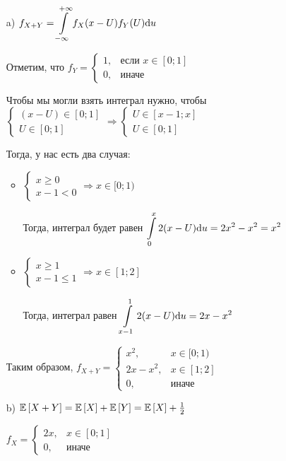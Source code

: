 \documentclass{article}
\begin{document}
\begin{enumerate}
    \item[a)] $f_{X+Y}=\displaystyle\int\limits_{-\infty}^{+\infty} f_{X}(x-U)f_{Y}(U)\text{d}u$

    Отметим, что $f_{Y}=\begin{cases}
        1,&\text{если }x\in[0;1]\\
        0,&\text{иначе}
    \end{cases}$
    
     Чтобы мы могли взять интеграл нужно, чтобы $\begin{cases}
        (x-U)\in[0;1]\\
        U\in[0;1]
    \end{cases}\Longrightarrow\begin{cases}
        U\in[x-1;x]\\
        U\in[0;1]
    \end{cases}$

    Тогда, у нас есть два случая:
    \begin{itemize}
        \item $\begin{cases}
            x\geqslant 0\\
            x-1<0
        \end{cases}\Longrightarrow x\in[0;1)$

        Тогда, интеграл будет равен $\displaystyle\int\limits_0^x 2(x-U)\text{d}u=2x^2-x^2=x^2$

        \item $\begin{cases}
            x\geqslant 1\\
            x-1\leqslant1
        \end{cases}\Longrightarrow x\in[1;2]$

        Тогда, интеграл равен $\displaystyle\int\limits_{x-1}^{1}2(x-U)\text{d}u=2x-x^2$
    \end{itemize}

    Таким образом, $f_{X+Y}=\begin{cases}
        x^2,&x\in[0;1)\\
        2x-x^2,&x\in[1;2]\\
        0,&\text{иначе}
    \end{cases}$

    \item[b)] $\mathbb{E}\left[X+Y\right]=\mathbb{E}\left[X\right]+\mathbb{E}\left[Y\right]=\mathbb{E}\left[X\right]+\frac{1}{2}$

    $f_{X}=\begin{cases}
        2x,&x\in[0;1]\\
        0,&\text{иначе}
    \end{cases}$


\end{enumerate}
\end{document}
